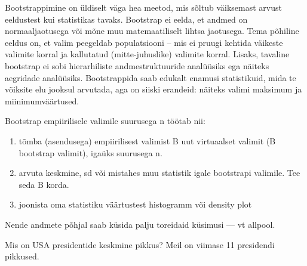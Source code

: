\documentclass[]{book}
\newenvironment{Shaded}{\begin{snugshade}}{\end{snugshade}}
\newcommand{\KeywordTok}[1]{\textcolor[rgb]{0.13,0.29,0.53}{\textbf{#1}}}
\newcommand{\DataTypeTok}[1]{\textcolor[rgb]{0.13,0.29,0.53}{#1}}
\newcommand{\DecValTok}[1]{\textcolor[rgb]{0.00,0.00,0.81}{#1}}
\newcommand{\StringTok}[1]{\textcolor[rgb]{0.31,0.60,0.02}{#1}}
\newcommand{\CommentTok}[1]{\textcolor[rgb]{0.56,0.35,0.01}{\textit{#1}}}
\newcommand{\OtherTok}[1]{\textcolor[rgb]{0.56,0.35,0.01}{#1}}
\newcommand{\ControlFlowTok}[1]{\textcolor[rgb]{0.13,0.29,0.53}{\textbf{#1}}}
\newcommand{\OperatorTok}[1]{\textcolor[rgb]{0.81,0.36,0.00}{\textbf{#1}}}
\newcommand{\NormalTok}[1]{#1}
\providecommand{\tightlist}{%
  \setlength{\itemsep}{0pt}\setlength{\parskip}{0pt}}
\begin{document}
Bootstrappimine on üldiselt väga hea meetod, mis sõltub väiksemast
arvust eeldustest kui statistikas tavaks. Bootstrap ei eelda, et andmed
on normaaljaotusega või mõne muu matemaatiliselt lihtsa jaotusega. Tema
põhiline eeldus on, et valim peegeldab populatsiooni -- mis ei pruugi
kehtida väikeste valimite korral ja kallutatud (mitte-juhuslike)
valimite korral. Lisaks, tavaline bootstrap ei sobi hierarhiliste
andmestruktuuride analüüsiks ega näiteks aegridade analüüsiks.
Bootstrappida saab edukalt enamusi statistikuid, mida te võiksite elu
jooksul arvutada, aga on siiski erandeid: näiteks valimi maksimum ja
miinimumväärtused.

Bootstrap empiirilisele valimile suurusega n töötab nii:

\begin{enumerate}
\def\labelenumi{\arabic{enumi}.}
\tightlist
\item
  tõmba (asendusega) empiirilisest valimist B uut virtuaalset valimit (B
  bootstrap valimit), igaüks suurusega n.
\item
  arvuta keskmine, sd või mistahes muu statistik igale bootstrapi
  valimile. Tee seda B korda.
\item
  joonista oma statistiku väärtustest histogramm või density plot
\end{enumerate}

Nende andmete põhjal saab küsida palju toreidaid küsimusi --- vt
allpool.

Mis on USA presidentide keskmine pikkus? Meil on viimase 11 presidendi
pikkused.










\begin{Shaded}
\end{Shaded}
\end{document}
